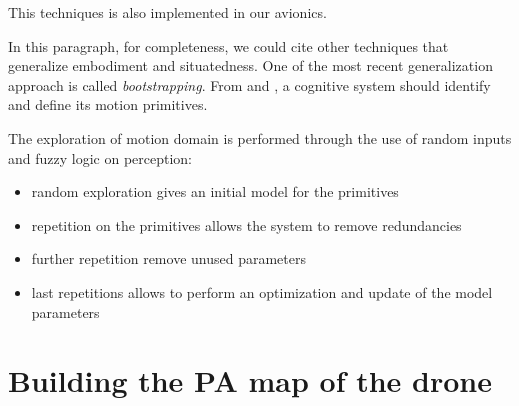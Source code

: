 This techniques is also implemented in our avionics.

In this paragraph, for completeness, we could cite other techniques that generalize embodiment and situatedness. One of the most recent generalization approach is called \emph{bootstrapping}. From \citep{sun2001implicit} and \citep{hierarchicalbootstrapping}, a cognitive system should identify and define its motion primitives. 

The exploration of motion domain is performed through the use of random inputs and fuzzy logic\citep{aframeworkforhierarchicalperceptionaction} on perception:
\begin{itemize}
\item random exploration gives an initial model for the primitives
\item repetition on the primitives allows the system to remove redundancies
\item further repetition remove unused parameters
\item last repetitions allows to perform an optimization and update of the model parameters
\end{itemize}

\section{Building the PA map of the drone}

